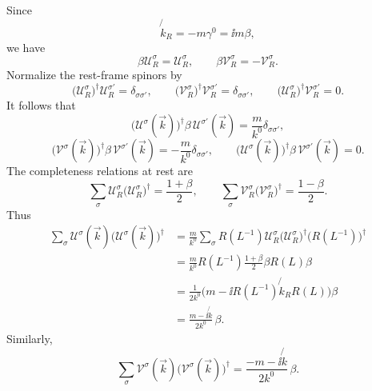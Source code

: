 Since
\[
  \not{k}_R=-m\gamma^0=\ii m\beta,
\]
we have
\[
  \beta\mathcal U_R^\sigma=\mathcal U_R^\sigma,
  \qquad
  \beta\mathcal V_R^\sigma=-\mathcal V_R^\sigma.
\]
Normalize the rest-frame spinors by
\[
  \bigl(\mathcal U_R^\sigma\bigr)^\dagger
  \mathcal U_R^{\sigma'}=\delta_{\sigma\sigma'},
  \qquad
  \bigl(\mathcal V_R^\sigma\bigr)^\dagger
  \mathcal V_R^{\sigma'}=\delta_{\sigma\sigma'},
  \qquad
  \bigl(\mathcal U_R^\sigma\bigr)^\dagger
  \mathcal V_R^{\sigma'}=0.
\]
It follows that
\[
  \bigl(\mathcal U^\sigma(\vec k)\bigr)^\dagger
  \beta\,\mathcal U^{\sigma'}(\vec k)
  =
  \frac{m}{k^0}\delta_{\sigma\sigma'},
\]
\[
  \bigl(\mathcal V^\sigma(\vec k)\bigr)^\dagger
  \beta\,\mathcal V^{\sigma'}(\vec k)
  =
  -\frac{m}{k^0}\delta_{\sigma\sigma'},
  \qquad
  \bigl(\mathcal U^\sigma(\vec k)\bigr)^\dagger
  \beta\,\mathcal V^{\sigma'}(\vec k)=0.
\]
The completeness relations at rest are
\[
  \sum_\sigma
  \mathcal U_R^\sigma\bigl(\mathcal U_R^\sigma\bigr)^\dagger
  =
  \frac{1+\beta}{2},
  \qquad
  \sum_\sigma
  \mathcal V_R^\sigma\bigl(\mathcal V_R^\sigma\bigr)^\dagger
  =
  \frac{1-\beta}{2}.
\]
Thus
\[
\begin{aligned}
  \sum_\sigma
  \mathcal U^\sigma(\vec k)
  \bigl(\mathcal U^\sigma(\vec k)\bigr)^\dagger
  &=
  \frac{m}{k^0}
  \sum_\sigma
  R(L^{-1})\mathcal U_R^\sigma
  \bigl(\mathcal U_R^\sigma\bigr)^\dagger
  \bigl(R(L^{-1})\bigr)^\dagger
  \\
  &=
  \frac{m}{k^0}
  R(L^{-1})\frac{1+\beta}{2}\beta R(L)\beta
  \\
  &=
  \frac{1}{2k^0}
  \bigl(m-\ii R(L^{-1})\not{k}_R R(L)\bigr)\beta
  \\
  &=
  \frac{m-\ii\not{k}}{2k^0}\,\beta.
\end{aligned}
\]
Similarly,
\[
  \sum_\sigma
  \mathcal V^\sigma(\vec k)
  \bigl(\mathcal V^\sigma(\vec k)\bigr)^\dagger
  =
  \frac{-m-\ii\not{k}}{2k^0}\,\beta.
\]

